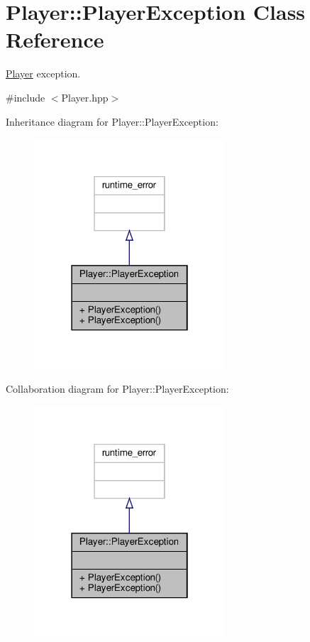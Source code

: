 \hypertarget{class_player_1_1_player_exception}{}\section{Player\+:\+:Player\+Exception Class Reference}
\label{class_player_1_1_player_exception}


\hyperlink{class_player}{Player} exception.  




{\ttfamily \#include $<$Player.\+hpp$>$}



Inheritance diagram for Player\+:\+:Player\+Exception\+:
\nopagebreak
\begin{figure}[H]
\begin{center}
\leavevmode
\includegraphics[width=202pt]{class_player_1_1_player_exception__inherit__graph}
\end{center}
\end{figure}


Collaboration diagram for Player\+:\+:Player\+Exception\+:
\nopagebreak
\begin{figure}[H]
\begin{center}
\leavevmode
\includegraphics[width=202pt]{class_player_1_1_player_exception__coll__graph}
\end{center}
\end{figure}
